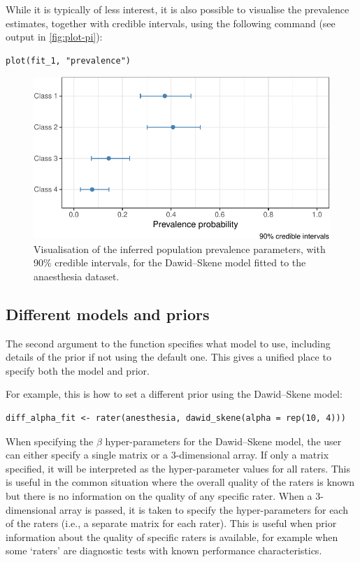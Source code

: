 While it is typically of less interest, it is also possible to visualise the
prevalence estimates, together with credible intervals, using the following
command (see output in \autoref{fig:plot-pi}):

\begin{verbatim}
plot(fit_1, "prevalence")
\end{verbatim}

\begin{figure}

{\centering \includegraphics{rater_files/figure-latex/plot-pi-1} 

}

\caption{Visualisation of the inferred population prevalence parameters, with 90\% credible intervals, for the Dawid--Skene model fitted to the anaesthesia dataset.}\label{fig:plot-pi}
\end{figure}

\hypertarget{sec:different-models-priors}{%
\subsection{Different models and priors}\label{sec:different-models-priors}}

The second argument to the  function specifies what model to use,
including details of the prior if not using the default one. This gives a
unified place to specify both the model and prior.

For example, this is how to set a different prior using the Dawid--Skene model:

\begin{verbatim}
diff_alpha_fit <- rater(anesthesia, dawid_skene(alpha = rep(10, 4)))
\end{verbatim}

When specifying the \(\beta\) hyper-parameters for the Dawid--Skene model, the
user can either specify a single matrix or a 3-dimensional array. If only a matrix
specified, it will be interpreted as the hyper-parameter values for all raters.
This is useful in the common situation where the overall quality of the raters
is known but there is no information on the quality of any specific rater.
When a 3-dimensional array is passed, it is taken to specify the hyper-parameters
for each of the raters (i.e., a separate matrix for each rater). This is
useful when prior information about the quality of specific raters is
available, for example when some `raters' are diagnostic tests with known
performance characteristics.

